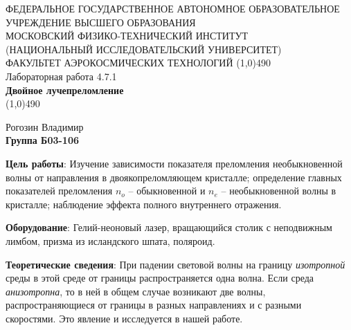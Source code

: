 \documentclass[a4paper,12pt]{article}
\begin{document}
\begin{titlepage}
\begin{center}
\large{\small ФЕДЕРАЛЬНОЕ ГОСУДАРСТВЕННОЕ АВТОНОМНОЕ ОБРАЗОВАТЕЛЬНОЕ\\ УЧРЕЖДЕНИЕ ВЫСШЕГО ОБРАЗОВАНИЯ \\ МОСКОВСКИЙ ФИЗИКО-ТЕХНИЧЕСКИЙ ИНСТИТУТ\\ (НАЦИОНАЛЬНЫЙ ИССЛЕДОВАТЕЛЬСКИЙ УНИВЕРСИТЕТ)\\ ФАКУЛЬТЕТ АЭРОКОСМИЧЕСКИХ ТЕХНОЛОГИЙ}
\vfill
\line(1,0){490}\\[1mm]
\huge{Лабораторная работа 4.7.1}\\
\huge\textbf{Двойное лучепреломление}\\
\line(1,0){490}\\[1mm]
\vfill
\begin{flushright}
\normalsize{Рогозин Владимир}\\
\normalsize{\textbf{Группа Б03-106}}\\
\end{flushright}
\end{center}
\end{titlepage}

\textbf{Цель работы}: 
Изучение зависимости показателя преломления необыкновенной волны от направления в двоякопреломляющем кристалле; определение главных показателей преломления $n_o$ -- обыкновенной и $n_e$ -- необыкновенной волны в кристалле; наблюдение эффекта полного внутреннего отражения.

\textbf{Оборудование}:
Гелий-неоновый лазер, вращающийся столик с неподвижным лимбом, призма из исландского шпата, поляроид.

\textbf{Теоретические сведения}:
При падении световой волны на границу \textit{изотропной} среды в этой среде от границы распространяется одна волна. Если среда \textit{анизотропна}, то в ней в общем случае возникают две волны, распространяющиеся от границы в разных направлениях и с разными скоростями. Это явление и исследуется в нашей работе.
\end{document}
